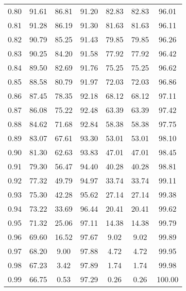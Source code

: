 \begin{tabular}{|c|c|c|c|c|c|c|}
      0.80 &     91.61 &     86.81 &      91.20 &   82.83 &      82.83 &         96.01 \\
      0.81 &     91.28 &     86.19 &      91.30 &   81.63 &      81.63 &         96.11 \\
      0.82 &     90.79 &     85.25 &      91.43 &   79.85 &      79.85 &         96.26 \\
      0.83 &     90.25 &     84.20 &      91.58 &   77.92 &      77.92 &         96.42 \\
      0.84 &     89.50 &     82.69 &      91.76 &   75.25 &      75.25 &         96.62 \\
      0.85 &     88.58 &     80.79 &      91.97 &   72.03 &      72.03 &         96.86 \\
      0.86 &     87.45 &     78.35 &      92.18 &   68.12 &      68.12 &         97.11 \\
      0.87 &     86.08 &     75.22 &      92.48 &   63.39 &      63.39 &         97.42 \\
      0.88 &     84.62 &     71.68 &      92.84 &   58.38 &      58.38 &         97.75 \\
      0.89 &     83.07 &     67.61 &      93.30 &   53.01 &      53.01 &         98.10 \\
      0.90 &     81.30 &     62.63 &      93.83 &   47.01 &      47.01 &         98.45 \\
      0.91 &     79.30 &     56.47 &      94.40 &   40.28 &      40.28 &         98.81 \\
      0.92 &     77.32 &     49.79 &      94.97 &   33.74 &      33.74 &         99.11 \\
      0.93 &     75.30 &     42.28 &      95.62 &   27.14 &      27.14 &         99.38 \\
      0.94 &     73.22 &     33.69 &      96.44 &   20.41 &      20.41 &         99.62 \\
      0.95 &     71.32 &     25.06 &      97.11 &   14.38 &      14.38 &         99.79 \\
      0.96 &     69.60 &     16.52 &      97.67 &    9.02 &       9.02 &         99.89 \\
      0.97 &     68.20 &      9.00 &      97.88 &    4.72 &       4.72 &         99.95 \\
      0.98 &     67.23 &      3.42 &      97.89 &    1.74 &       1.74 &         99.98 \\
      0.99 &     66.75 &      0.53 &      97.29 &    0.26 &       0.26 &        100.00 \\
\bottomrule
\end{tabular}
